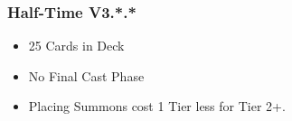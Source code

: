 \subsubsection{Half-Time V3.*.*}
\begin{itemize}
    \item 25 Cards in Deck
    \item No Final Cast Phase
    \item Placing Summons cost 1 Tier less for Tier 2+. 
\end{itemize}